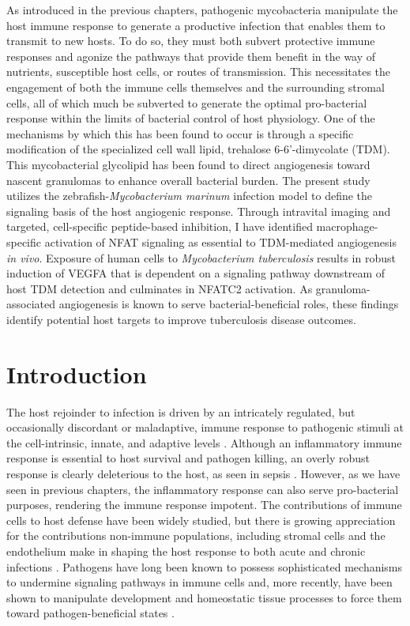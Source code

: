 As introduced in the previous chapters, pathogenic mycobacteria manipulate the host immune response to generate a productive infection that enables them to transmit to new hosts. To do so, they must both subvert protective immune responses and agonize the pathways that provide them benefit in the way of nutrients, susceptible host cells, or routes of transmission. This necessitates the engagement of both the immune cells themselves and the surrounding stromal cells, all of which much be subverted to generate the optimal pro\hyp{}bacterial response within the limits of bacterial control of host physiology. One of the mechanisms by which this has been found to occur is through a specific modification of the specialized cell wall lipid, trehalose 6\hyp{}6'\hyp{}dimycolate (TDM). This mycobacterial glycolipid has been found to direct angiogenesis toward nascent granulomas to enhance overall bacterial burden. The present study utilizes the zebrafish\hyp{}\textit{Mycobacterium marinum} infection model to define the signaling basis of the host angiogenic response. Through intravital imaging and targeted, cell\hyp{}specific peptide\hyp{}based inhibition, I have identified macrophage\hyp{}specific activation of NFAT signaling as essential to TDM\hyp{}mediated angiogenesis \textit{in vivo}.  Exposure of human cells to \textit{Mycobacterium tuberculosis} results in robust induction of VEGFA that is dependent on a signaling pathway downstream of host TDM detection and culminates in NFATC2 activation. As granuloma\hyp{}associated angiogenesis is known to serve bacterial\hyp{}beneficial roles, these findings identify potential host targets to improve tuberculosis disease outcomes.

\section{Introduction}\label{pap:intro}

The host rejoinder to infection is driven by an intricately regulated, but occasionally discordant or maladaptive, immune response to pathogenic stimuli at the cell\hyp{}intrinsic, innate, and adaptive levels \citep{Iwasaki2010, Finlay2006, Haldar2015, MacMicking2004, MacMicking2012, Kim2012, Wilburn2022}. Although an inflammatory immune response is essential to host survival and pathogen killing, an overly robust response is clearly deleterious to the host, as seen in sepsis \citep{Finethy2020, Casadevall2003}. However, as we have seen in previous chapters, the inflammatory response can also serve pro\hyp{}bacterial purposes, rendering the immune response impotent. The contributions of immune cells to host defense have been widely studied, but there is growing appreciation for the contributions non\hyp{}immune populations, including stromal cells and the endothelium \citep{Honan2021, Worrell2021, Amersfoort2022, Honan2021} make in shaping the host response to both acute and chronic infections \citep{Mueller2009, Randow2013, Krishnamurty2020}. Pathogens have long been known to possess sophisticated mechanisms to undermine signaling pathways in immune cells and, more recently, have been shown to manipulate development and homeostatic tissue processes to force them toward pathogen\hyp{}beneficial states \citep{Menzies1998, Guichard2013}.


